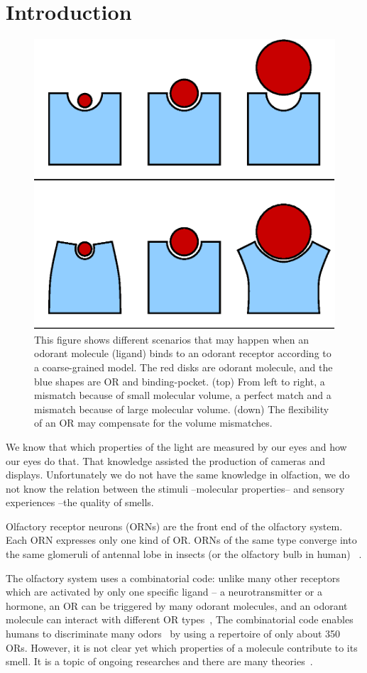 \documentclass[fleqn,11pt]{wlscirep}
\begin{document}
\section*{Introduction}
\begin{figure}
	\centering
	\includegraphics[width=0.4 \textwidth]{binding-pocket-size-flex}
	\caption{This figure shows different scenarios that may happen when an odorant molecule (ligand) binds to an odorant receptor according to a coarse-grained model. 
		The red disks  are odorant molecule, 
		and the blue shapes are OR and binding-pocket.	
		(top) From left to right, a mismatch because of small molecular volume, 
		a perfect match and a mismatch because of large molecular volume.
		(down) The flexibility of an OR may compensate for the volume mismatches.
		}
	\label{fig:binding-pocket}
\end{figure}

We know that which properties of the light are measured by our eyes and how our eyes do that. 
That knowledge assisted the production of cameras and displays. 
Unfortunately we do not have the same knowledge in olfaction, 
we do not know the relation between the stimuli --molecular properties-- and sensory experiences --the quality of smells.  

Olfactory receptor neurons (ORNs) are  the front end of the olfactory system.
Each ORN expresses only one kind of OR. 
ORNs of the same type converge into the same glomeruli of antennal lobe in insects (or the olfactory bulb in human)
~\cite{root2007,Carey2011,Vosshall2000,Couto2005,fishilevich2005,gao2000,wang1998,mombaerts1996,vassar1994}.

The olfactory system uses a combinatorial code: 
unlike many other receptors which are activated by only one specific ligand -- a neurotransmitter or a hormone,
an OR can be triggered by many odorant molecules, 
and an odorant molecule can interact with different OR types~\cite{Malnic2000},
The combinatorial code enables humans to discriminate many odors~\cite{Bushdid2014} by using a repertoire of only about 350 ORs.
However, it is not clear yet which properties of a molecule contribute to its smell. 
It is a topic of ongoing researches and there are many theories~\cite{Turin,Keller2004,Araneda2000,Brookes2007,Franco2011,Pelz2006,Gabler2013,Schmuker2007,Haddad2008,Snitz2013,Yablonka2012,gane2013,
turin2015plausibility,block2015implausibility,vosshall2015laying}.
\end{document}
